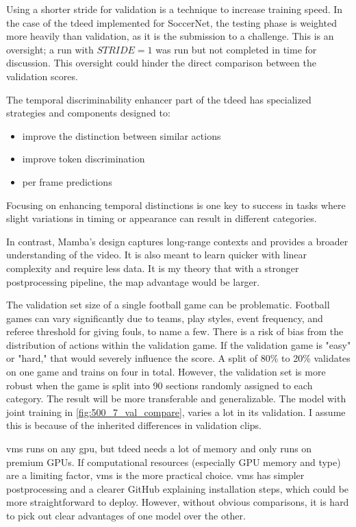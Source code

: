 Using a shorter stride for validation is a technique to increase training speed. In the case of the \acrshort{tdeed} implemented for SoccerNet, the testing phase is weighted more heavily than validation, as it is the submission to a challenge. This is an oversight; a run with \(STRIDE=1\) was run but not completed in time for discussion. This oversight could hinder the direct comparison between the validation scores. 


The temporal discriminability enhancer part of the \acrfull{tdeed} has specialized strategies and components designed to:
\begin{itemize}
    \item improve the distinction between similar actions
    \item improve token discrimination
    \item per frame predictions
\end{itemize}

Focusing on enhancing temporal distinctions is one key to success in tasks where slight variations in timing or appearance can result in different categories. 

In contrast, Mamba's design captures long-range contexts and provides a broader understanding of the video. It is also meant to learn quicker with linear complexity and require less data. It is my theory that with a stronger postprocessing pipeline, the \acrshort{map} advantage would be larger. 

The validation set size of a single football game can be problematic. Football games can vary significantly due to teams, play styles, event frequency, and referee threshold for giving fouls, to name a few. There is a risk of bias from the distribution of actions within the validation game. If the validation game is "easy" or "hard," that would severely influence the score. A split of 80\% to 20\% validates on one game and trains on four in total. However, the validation set is more robust when the game is split into 90 sections randomly assigned to each category. The result will be more transferable and generalizable. The model with joint training in \cref{fig:500_7_val_compare}, varies a lot in its validation. I assume this is because of the inherited differences in validation clips. 

\acrshort{vms} runs on any \acrshort{gpu}, but \acrshort{tdeed} needs a lot of memory and only runs on premium GPUs. If computational resources (especially GPU memory and type) are a limiting factor, \acrshort{vms} is the more practical choice. \acrshort{vms} has simpler postprocessing and a clearer GitHub explaining installation steps, which could be more straightforward to deploy. However, without obvious comparisons, it is hard to pick out clear advantages of one model over the other. 


